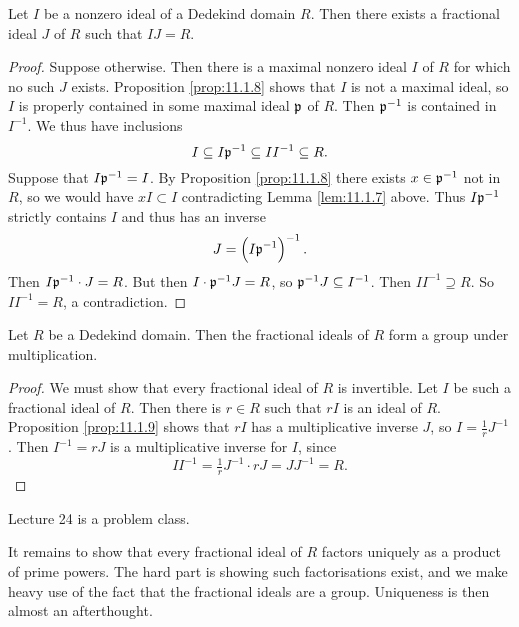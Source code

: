 \begin{proposition}
\label{prop:11.1.9}
Let $ I $ be a nonzero ideal of a Dedekind domain $ R $. Then there exists a fractional ideal $ J $ of $ R $ such that $ IJ = R $.
\end{proposition}

\begin{proof}
Suppose otherwise. Then there is a maximal nonzero ideal $ I $ of $ R $ for which no such $ J $ exists. Proposition \ref{prop:11.1.8} shows that $ I $ is not a maximal ideal, so $ I $ is properly contained in some maximal ideal $ \mathfrak{p} $ of $ R $. Then $ \mathfrak{p}^{-1} $ is contained in $ I^{-1} $. We thus have inclusions
$$ I \subseteq I\mathfrak{p}^{-1} \subseteq II^{-1} \subseteq R. $$
Suppose that $ I\mathfrak{p}^{-1} = I $. By Proposition \ref{prop:11.1.8} there exists $ x \in \mathfrak{p}^{-1} $ not in $ R $, so we would have $ xI \subset I $ contradicting Lemma \ref{lem:11.1.7} above. Thus $ I\mathfrak{p}^{-1} $ strictly contains $ I $ and thus has an inverse
$$ J = \br{I\pp^{-1}}^{-1}. $$
Then $ I\mathfrak{p}^{-1} \cdot J = R $. But then $ I \cdot \mathfrak{p}^{-1}J = R $, so $ \mathfrak{p}^{-1}J \subseteq I^{-1} $. Then $ II^{-1} \supseteq R $. So $ II^{-1} = R $, a contradiction.
\end{proof}

\begin{theorem}
Let $ R $ be a Dedekind domain. Then the fractional ideals of $ R $ form a group under multiplication.
\end{theorem}

\begin{proof}
We must show that every fractional ideal of $ R $ is invertible. Let $ I $ be such a fractional ideal of $ R $. Then there is $ r \in R $ such that $ rI $ is an ideal of $ R $. Proposition \ref{prop:11.1.9} shows that $ rI $ has a multiplicative inverse $ J $, so $ I = \tfrac{1}{r}J^{-1} $. Then $ I^{-1} = rJ $ is a multiplicative inverse for $ I $, since
$$ II^{-1} = \tfrac{1}{r}J^{-1} \cdot rJ = JJ^{-1} = R. $$
\end{proof}


Lecture 24 is a problem class.


It remains to show that every fractional ideal of $ R $ factors uniquely as a product of prime powers. The hard part is showing such factorisations exist, and we make heavy use of the fact that the fractional ideals are a group. Uniqueness is then almost an afterthought.


